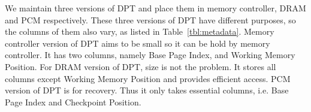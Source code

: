 \documentclass[conference]{IEEEtran}
\begin{document}


We maintain three versions of DPT and place them in memory controller, DRAM and PCM respectively.
These three versions of DPT have different purposes, so the columns of them also vary, as listed in Table~\ref{tbl:metadata}.
Memory controller version of DPT aims to be small so it can be hold by memory controller.
It has two columns, namely Base Page Index, and Working Memory Position.
For DRAM version of DPT, size is not the problem.
It stores all columns except Working Memory Position and provides efficient access.
PCM version of DPT is for recovery.
Thus it only takes essential columns, i.e. Base Page Index and Checkpoint Position.

\end{document}
